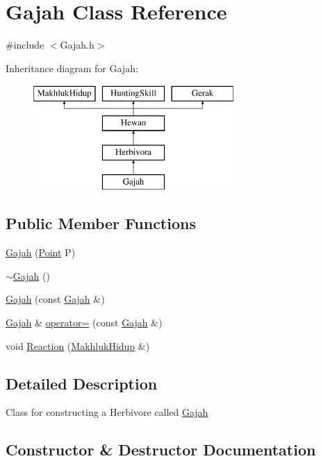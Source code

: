 \hypertarget{class_gajah}{}\section{Gajah Class Reference}
\label{class_gajah}


{\ttfamily \#include $<$Gajah.\+h$>$}

Inheritance diagram for Gajah\+:\begin{figure}[H]
\begin{center}
\leavevmode
\includegraphics[height=4.000000cm]{class_gajah}
\end{center}
\end{figure}
\subsection*{Public Member Functions}
\begin{DoxyCompactItemize}
\item 
\hyperlink{class_gajah_ad7809290b46a37d2e400d80118b985ab}{Gajah} (\hyperlink{class_point}{Point} P)
\item 
\hyperlink{class_gajah_aaaa748418eccdb8a77dd6cd178391aa7}{$\sim$\+Gajah} ()
\item 
\hyperlink{class_gajah_a077d7639b153d0c51bb4e458de4cbc9d}{Gajah} (const \hyperlink{class_gajah}{Gajah} \&)
\item 
\hyperlink{class_gajah}{Gajah} \& \hyperlink{class_gajah_a1ec6d4ac29cf4bb30a1a4ed1faed25b4}{operator=} (const \hyperlink{class_gajah}{Gajah} \&)
\item 
void \hyperlink{class_gajah_ae9f98bedbe835809f53875b234804e08}{Reaction} (\hyperlink{class_makhluk_hidup}{Makhluk\+Hidup} \&)
\end{DoxyCompactItemize}


\subsection{Detailed Description}
Class for constructing a Herbivore called \hyperlink{class_gajah}{Gajah} 

\subsection{Constructor \& Destructor Documentation}
